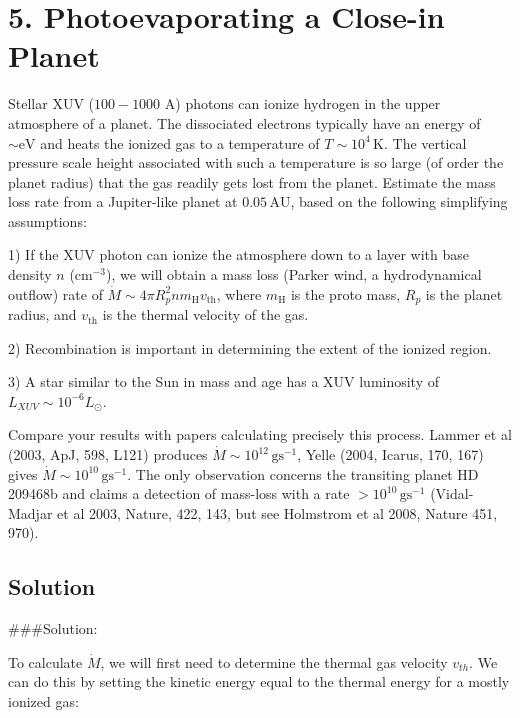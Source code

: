 \documentclass[12pt]{article}
\begin{document}

\section*{5. Photoevaporating a Close-in Planet}

Stellar XUV ($100-1000$ A) photons can ionize hydrogen in the upper atmosphere of a planet. The dissociated electrons typically have an energy of $\sim \mathrm{eV}$ and heats the ionized gas to a temperature of $T \sim 10^4 \, \mathrm{K}$. The vertical pressure scale height associated with such a temperature is so large (of order the planet radius) that the gas readily gets lost from the planet. Estimate the mass loss rate from a Jupiter-like planet at $0.05 \, \mathrm{AU}$, based on the following simplifying assumptions:

1) If the XUV photon can ionize the atmosphere down to a layer with base density $n$ ($\mathrm{cm^{-3}}$), we will obtain a mass loss (Parker wind, a hydrodynamical outflow) rate of $\dot{M} \sim 4\pi R_p^2nm_\mathrm{H}v_\mathrm{th}$, where $m_\mathrm{H}$ is the proto mass, $R_p$ is the planet radius, and $v_\mathrm{th}$ is the thermal velocity of the gas.

2) Recombination is important in determining the extent of the ionized region.

3) A star similar to the Sun in mass and age has a XUV luminosity of $L_{XUV} \sim 10^{-6}L_{\odot}$.

Compare your results with papers calculating precisely this process. Lammer et al (2003, ApJ, 598, L121) produces $\dot{M} \sim 10^{12}\,\mathrm{gs^{-1}}$, Yelle (2004, Icarus, 170, 167) gives $\dot{M} \sim 10^{10}\,\mathrm{gs^{-1}}$. The only observation concerns the transiting planet HD 209468b and claims a detection of mass-loss with a rate $> 10^{10}\,\mathrm{gs^{-1}}$ (Vidal-Madjar et al 2003, Nature, 422, 143, but see Holmstrom et al 2008, Nature 451, 970).

\subsection*{Solution}

###Solution:

To calculate $\dot{M}$, we will first need to determine the thermal gas velocity $v_{th}$. We can do this by setting the kinetic energy equal to the thermal energy for a mostly ionized gas:
\end{document}
